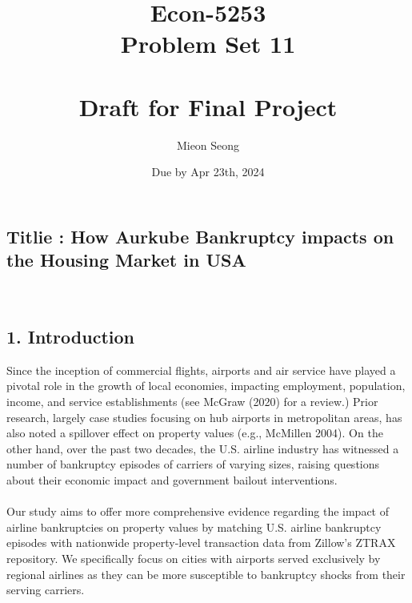 \documentclass[12pt, letterpaper]{article}
\title{Econ-5253\\
{Problem Set 11}  \\
\\
{Draft for Final Project}
\large  \vspace{-1em}}
\author{Mieon Seong}
\date{Due by Apr 23th, 2024}
\begin{document}
\setlength{\abovedisplayskip}{5pt}
\setlength{\belowdisplayskip}{5pt}
\setlength{\abovedisplayshortskip}{5pt}
\setlength{\belowdisplayshortskip}{5pt}

\maketitle

\subsection*{Titlie : How Aurkube Bankruptcy impacts on the Housing Market in USA}
\\
\subsection*{1. Introduction}
{Since the inception of commercial flights, airports and air service have played a pivotal role in the growth of local economies, impacting employment, population, income, and service establishments (see McGraw (2020) for a review.) Prior research, largely case studies focusing on hub airports in metropolitan areas, has also noted a spillover effect on property values (e.g., McMillen 2004). On the other hand, over the past two decades, the U.S. airline industry has witnessed a number of bankruptcy episodes of carriers of varying sizes, raising questions about their economic impact and government bailout interventions. }\\
\\
{Our study aims to offer more comprehensive evidence regarding the impact of airline bankruptcies on property values by matching U.S. airline bankruptcy episodes with nationwide property-level transaction data from Zillow's ZTRAX repository. We specifically focus on cities with airports served exclusively by regional airlines as they can be more susceptible to bankruptcy shocks from their serving carriers. }
\\
\end{document}
